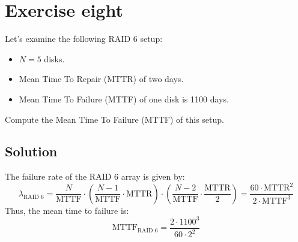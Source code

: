 \section{Exercise eight}

Let's examine the following RAID 6 setup:
\begin{itemize}
    \item $N=5$ disks.
    \item Mean Time To Repair (MTTR) of two days.
    \item Mean Time To Failure (MTTF) of one disk is 1100 days.
\end{itemize}
Compute the Mean Time To Failure (MTTF) of this setup.

\subsection*{Solution}
The failure rate of the RAID 6 array is given by:
\[\lambda_{\text{RAID 6}}=\dfrac{N}{\text{MTTF}}\cdot\left(\dfrac{N-1}{\text{MTTF}}\cdot\text{MTTR}\right)\cdot\left(\dfrac{N-2}{\text{MTTF}}\cdot\dfrac{\text{MTTR}}{2}\right)=\dfrac{60\cdot\text{MTTR}^2}{2\cdot\text{MTTF}^3}\]
Thus, the mean time to failure is:
\[\text{MTTF}_{\text{RAID 6}}=\dfrac{2\cdot 1100^3}{60\cdot 2^2}\]